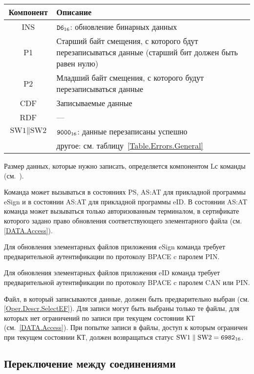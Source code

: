 \begin{table}[hbt]
\caption{}\label{Table.Oper.UpdateCmd}
\begin{tabular}{|c|p{14cm}|}
\hline
Компонент & Описание\\
\hline
\hline
INS & $\texttt{D6}_{16}$: обновление бинарных данных\\
\hline
P1 & Старший байт смещения, с которого бдут перезаписываться данные 
(старший бит должен быть равен нулю) \\
\hline
P2 & Младший байт смещения, с которого будут перезаписываться данные \\
\hline
CDF & Записываемые данные \\
\hline 
RDF &  --- \\
\hline
$\text{SW1} \parallel \text{SW2}$ & 
$\texttt{9000}_{16}$: данные перезаписаны успешно \\
 & другое: см. таблицу~\ref{Table.Errors.General} \\
\hline
\end{tabular}
\end{table}

Размер данных, которые нужно записать, определяется компонентом Lс команды 
(см.~\cite{APDU}).

Команда может вызываться в состояниях PS, AS:AT 
для прикладной программы eSign и в состоянии 
AS:AT для прикладной программы eID.
В состоянии AS:AT команда может вызываться только 
авторизованным терминалом, в сертификате которого
задано право обновления соответствующего 
элементарного файла (см. \ref{DATA.Access}).

Для обновления элементарных файлов приложения eSign команда требует 
предварительной аутентификации по протоколу BPACE c 
паролем PIN.

Для обновления элементарных файлов приложения eID команда требует 
предварительной аутентификации по протоколу BPACE c 
паролем CAN или PIN.

Файл, в который записываются данные, должен быть предварительно
выбран (см. \ref{Oper.Descr.SelectEF}).
Для записи могут быть выбраны только те файлы, для которых 
нет ограничений по записи при текущем состоянии КТ (см.~\ref{DATA.Access}). 
При попытке записи в файлы, доступ к которым ограничен при текущем состоянии КТ, 
должен возвращаться статус $\text{SW1} \parallel\text{SW2} = \texttt{6982}_{16}$. 


\subsection{Переключение между соединениями}
\label{Oper.Descr.SetCS}

